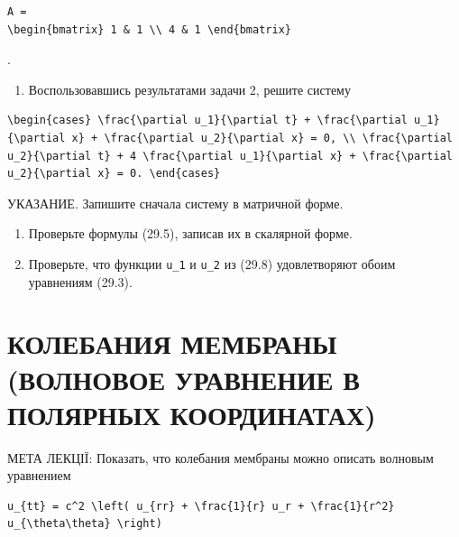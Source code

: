 \documentclass[
  ukrainian,
]{article}
\providecommand{\tightlist}{%
  \setlength{\itemsep}{0pt}\setlength{\parskip}{0pt}}
\begin{document}
\begin{verbatim}
A =
\begin{bmatrix} 1 & 1 \\ 4 & 1 \end{bmatrix}
\end{verbatim}

.

\begin{enumerate}
\def\labelenumi{\arabic{enumi}.}
\setcounter{enumi}{2}
\tightlist
\item
  Воспользовавшись результатами задачи 2, решите систему
\end{enumerate}

\begin{verbatim}
\begin{cases} \frac{\partial u_1}{\partial t} + \frac{\partial u_1}{\partial x} + \frac{\partial u_2}{\partial x} = 0, \\ \frac{\partial u_2}{\partial t} + 4 \frac{\partial u_1}{\partial x} + \frac{\partial u_2}{\partial x} = 0. \end{cases}
\end{verbatim}

УКАЗАНИЕ. Запишите сначала систему в матричной форме.

\begin{enumerate}
\def\labelenumi{\arabic{enumi}.}
\setcounter{enumi}{3}
\item
  Проверьте формулы (29.5), записав их в скалярной форме.
\item
  Проверьте, что функции \texttt{u\_1} и \texttt{u\_2} из (29.8)
  удовлетворяют обоим уравнениям (29.3).
\end{enumerate}

\section{КОЛЕБАНИЯ МЕМБРАНЫ (ВОЛНОВОЕ УРАВНЕНИЕ В ПОЛЯРНЫХ
КООРДИНАТАХ)}\label{ux43aux43eux43bux435ux431ux430ux43dux438ux44f-ux43cux435ux43cux431ux440ux430ux43dux44b-ux432ux43eux43bux43dux43eux432ux43eux435-ux443ux440ux430ux432ux43dux435ux43dux438ux435-ux432-ux43fux43eux43bux44fux440ux43dux44bux445-ux43aux43eux43eux440ux434ux438ux43dux430ux442ux430ux445}

МЕТА ЛЕКЦІЇ: Показать, что колебания мембраны можно описать волновым
уравнением

\begin{verbatim}
u_{tt} = c^2 \left( u_{rr} + \frac{1}{r} u_r + \frac{1}{r^2} u_{\theta\theta} \right)
\end{verbatim}
\end{document}
